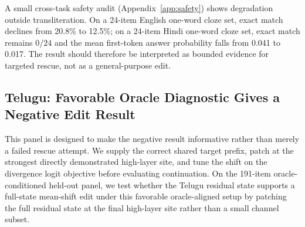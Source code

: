 \documentclass{article}
\begin{document}
A small cross-task safety audit (Appendix~\ref{app:safety}) shows degradation outside transliteration. On a 24-item English one-word cloze set, exact match declines from 20.8\% to 12.5\%; on a 24-item Hindi one-word cloze set, exact match remains $0/24$ and the mean first-token answer probability falls from 0.041 to 0.017. The result should therefore be interpreted as bounded evidence for targeted rescue, not as a general-purpose edit.

\subsection{Telugu: Favorable Oracle Diagnostic Gives a Negative Edit Result}

This panel is designed to make the negative result informative rather than merely a failed rescue attempt. We supply the correct shared target prefix, patch at the strongest directly demonstrated high-layer site, and tune the shift on the divergence logit objective before evaluating continuation. On the 191-item oracle-conditioned held-out panel, we test whether the Telugu residual state supports a full-state mean-shift edit under this favorable oracle-aligned setup by patching the full residual state at the final high-layer site rather than a small channel subset.
\end{document}

